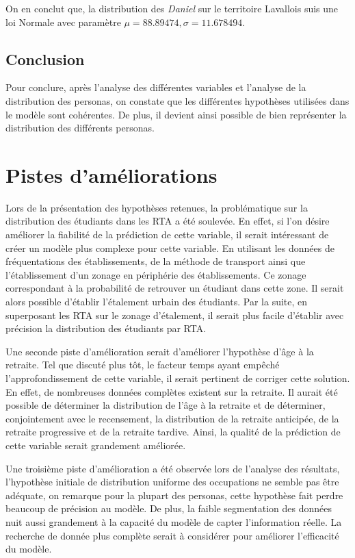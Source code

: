 \documentclass[11pt,french]{article}\usepackage[]{graphicx}\usepackage[]{color}
\begin{document}
On en conclut que, la distribution des \emph{Daniel} sur le territoire Lavallois suis une loi Normale avec paramètre $\mu = 88.89474, \sigma = 11.678494$.

\subsection*{Conclusion}
Pour conclure, après l'analyse des différentes variables et l'analyse de la distribution des personas, on constate que les différentes hypothèses utilisées dans le modèle sont cohérentes. De plus, il devient ainsi possible de bien représenter la distribution des différents personas.


\section{Pistes d'améliorations}

Lors de la présentation des hypothèses retenues, la problématique sur la distribution des étudiants dans les RTA a été soulevée. En effet, si l'on désire améliorer la fiabilité de la prédiction de cette variable, il serait intéressant de créer un modèle plus complexe pour cette variable. En utilisant les données de fréquentations des établissements, de la méthode de transport ainsi que l'établissement d'un zonage en périphérie des établissements. Ce zonage correspondant à la probabilité de retrouver un étudiant dans cette zone. Il serait alors possible d'établir l'étalement urbain des étudiants. Par la suite, en superposant les RTA sur le zonage d'étalement, il serait plus facile d'établir avec précision la distribution des étudiants par RTA. 
\newline

Une seconde piste d'amélioration serait d'améliorer l'hypothèse d'âge à la retraite. Tel que discuté plus tôt, le facteur temps ayant empêché l'approfondissement de cette variable, il serait pertinent de corriger cette solution. En effet, de nombreuses données complètes existent sur la retraite. Il aurait été possible de déterminer la distribution de l'âge à la retraite et de déterminer, conjointement avec le recensement, la distribution de la retraite anticipée, de la retraite progressive et de la retraite tardive. Ainsi, la qualité de la prédiction de cette variable serait grandement améliorée.
\newline

Une troisième piste d'amélioration a été observée lors de l'analyse des résultats, l'hypothèse initiale de distribution uniforme des occupations ne semble pas être adéquate, on remarque pour la plupart des personas, cette hypothèse fait perdre beaucoup de précision au modèle. De plus, la faible segmentation des données nuit aussi grandement à la capacité du modèle de capter l'information réelle. La recherche de donnée plus complète serait à considérer pour améliorer l'efficacité du modèle.
\newline
\end{document}
